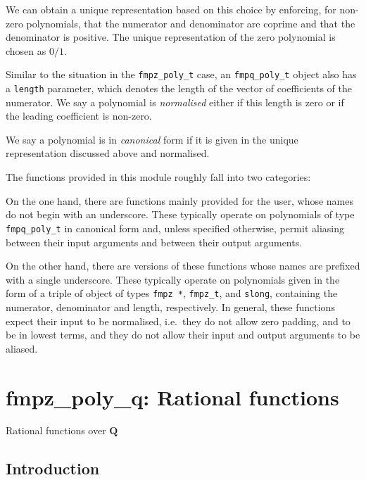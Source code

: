 \documentclass[a4paper,10pt]{book}
\newcommand{\Q}{\mathbf{Q}}%
\newcommand{\code}{\lstinline}
\begin{document}
{{We can obtain a unique representation based on this choice by enforcing,
for non-zero polynomials, that the numerator and denominator are coprime
and that the denominator is positive.  The unique representation of the
zero polynomial is chosen as $0/1$.

Similar to the situation in the \code{fmpz_poly_t} case, an
\code{fmpq_poly_t} object also has a \code{length} parameter, which
denotes the length of the vector of coefficients of the numerator.
We say a polynomial is \emph{normalised} either if this length is zero
or if the leading coefficient is non-zero.

We say a polynomial is in \emph{canonical} form if it is given in the
unique representation discussed above and normalised.

The functions provided in this module roughly fall into two categories:

On the one hand, there are functions mainly provided for the user, whose
names do not begin with an underscore.  These typically operate on
polynomials of type \code{fmpq_poly_t} in canonical form and, unless
specified otherwise, permit aliasing between their input arguments and
between their output arguments.

On the other hand, there are versions of these functions whose names are
prefixed with a single underscore.  These typically operate on polynomials
given in the form of a triple of object of types \code{fmpz *},
\code{fmpz_t}, and \code{slong}, containing the numerator, denominator and
length, respectively.  In general, these functions expect their input to
be normalised, i.e.\ they do not allow zero padding, and to be in lowest
terms, and they do not allow their input and output arguments to be aliased.




\chapter{fmpz\_poly\_q: Rational functions}
\epigraph{Rational functions over $\Q$}{}

\section{Introduction}

}}
\end{document}
